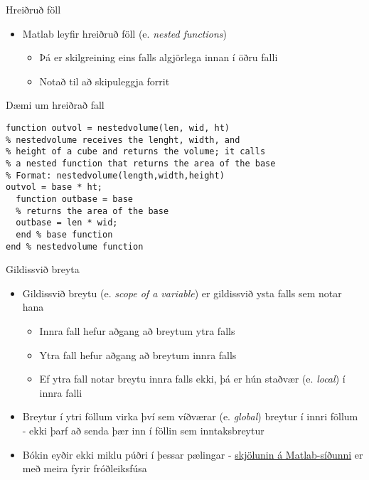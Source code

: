 \documentclass{beamer}
\begin{document}
\begin{frame}{Hreiðruð föll}
\begin{itemize}
 \item Matlab leyfir hreiðruð föll (e. \emph{nested functions})
 \begin{itemize}
  \item Þá er skilgreining eins falls algjörlega innan í öðru falli
  \item Notað til að skipuleggja forrit
 \end{itemize}
\end{itemize}
\end{frame}

\begin{frame}[fragile]{Dæmi um hreiðrað fall}
\begin{verbatim}
function outvol = nestedvolume(len, wid, ht)
% nestedvolume receives the lenght, width, and
% height of a cube and returns the volume; it calls
% a nested function that returns the area of the base
% Format: nestedvolume(length,width,height)
outvol = base * ht;
  function outbase = base
  % returns the area of the base
  outbase = len * wid;
  end % base function
end % nestedvolume function
\end{verbatim}

\end{frame}


\begin{frame}{Gildissvið breyta}
\vspace{\baselineskip}
\begin{itemize}
 \item Gildissvið breytu (e. \emph{scope of a variable}) er gildissvið ysta falls sem notar hana
 \begin{itemize}
  \item Innra fall hefur aðgang að breytum ytra falls
  \item Ytra fall hefur aðgang að breytum innra falls
  \item Ef ytra fall notar breytu innra falls ekki, þá er hún staðvær (e. \emph{local}) í innra falli
 \end{itemize}
 \item Breytur í ytri föllum virka því sem víðværar (e. \emph{global}) breytur í innri föllum - ekki þarf að senda þær inn í föllin sem inntaksbreytur
 \item Bókin eyðir ekki miklu púðri í þessar pælingar - \href{http://se.mathworks.com/help/matlab/matlab_prog/nested-functions.html?refresh=true}{skjölunin á Matlab-síðunni} er með meira fyrir fróðleiksfúsa
\end{itemize}
\end{frame}
\end{document}
